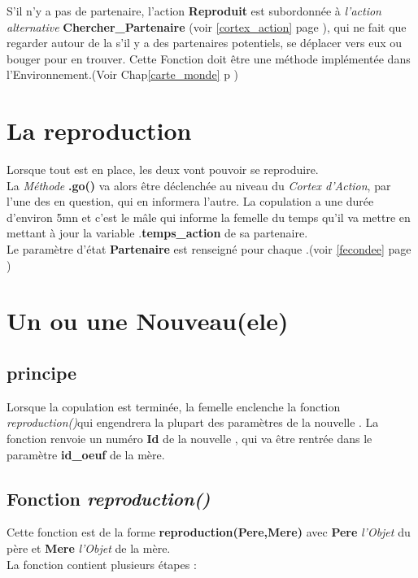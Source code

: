 \documentclass[french]{report}
\newlength{\du}\fi
\begin{document}
S'il n'y a pas de partenaire, l'action \textbf{Reproduit} est subordonnée à \textit{l'action alternative}  \textbf{Chercher\_Partenaire} (voir \ref{cortex_action} page \pageref{cortex_action}), qui ne fait que regarder autour de la \CoCiX s'il y a des partenaires potentiels, se déplacer vers eux ou bouger pour en trouver. Cette Fonction doit être une méthode implémentée dans l’Environnement.(Voir Chap\ref{carte_monde} p \pageref{carte_monde})\\

\section{La reproduction}
Lorsque tout est en place, les deux \CoCiX vont pouvoir se reproduire.\\
La \textit{Méthode} \textbf{.go()} va alors être déclenchée au niveau du \textit{Cortex d'Action}, par l'une des \CoCiX en question, qui en informera l'autre. La copulation a une durée d'environ 5mn et c'est le mâle qui informe la femelle du temps qu'il va mettre en mettant à jour la variable .\textbf{temps\_action} de sa partenaire.\\
Le paramètre d'état \textbf{Partenaire} est renseigné pour chaque \CoCiX.(voir \ref{fecondee} page \pageref{fecondee})\\

\section{Un ou une Nouveau(ele) \CoCiX}
\subsection{principe}
Lorsque la copulation est terminée, la femelle enclenche la fonction \textit{reproduction()}qui engendrera la plupart des paramètres de la nouvelle \CoCiX. La fonction renvoie un numéro \textbf{Id} de la nouvelle \CoCiX, qui va être rentrée dans le paramètre \textbf{id\_oeuf} de la mère.\\

\subsection{Fonction \textit{reproduction()}}
Cette fonction est de la forme \textbf{reproduction(Pere,Mere)} avec \textbf{Pere} \textit{l'Objet} \CoCiX du père et \textbf{Mere}  \textit{l'Objet} \CoCiX de la mère.\\
La fonction contient plusieurs étapes :
\end{document}
